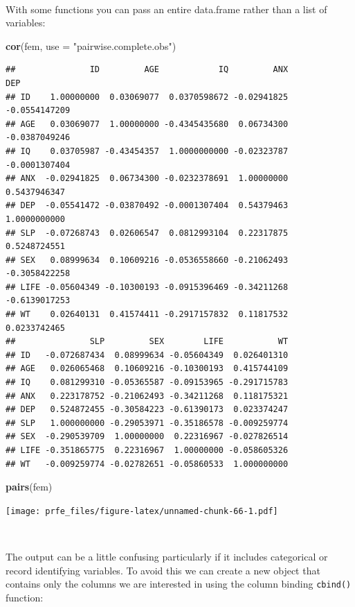 \documentclass[12pt,a4paper]{book}
\newenvironment{Shaded}{\begin{snugshade}}{\end{snugshade}}
\newcommand{\KeywordTok}[1]{\textcolor[rgb]{0.13,0.29,0.53}{\textbf{#1}}}
\newcommand{\DataTypeTok}[1]{\textcolor[rgb]{0.13,0.29,0.53}{#1}}
\newcommand{\StringTok}[1]{\textcolor[rgb]{0.31,0.60,0.02}{#1}}
\newcommand{\NormalTok}[1]{#1}
\theoremstyle{definition}
\theoremstyle{definition}
\theoremstyle{definition}
\theoremstyle{remark}
\begin{document}
~

With some functions you can pass an entire data.frame rather than a list
of variables:

\begin{Shaded}
\begin{Highlighting}[]
\KeywordTok{cor}\NormalTok{(fem, }\DataTypeTok{use =} \StringTok{"pairwise.complete.obs"}\NormalTok{)}
\end{Highlighting}
\end{Shaded}

\begin{verbatim}
##               ID         AGE            IQ         ANX           DEP
## ID    1.00000000  0.03069077  0.0370598672 -0.02941825 -0.0554147209
## AGE   0.03069077  1.00000000 -0.4345435680  0.06734300 -0.0387049246
## IQ    0.03705987 -0.43454357  1.0000000000 -0.02323787 -0.0001307404
## ANX  -0.02941825  0.06734300 -0.0232378691  1.00000000  0.5437946347
## DEP  -0.05541472 -0.03870492 -0.0001307404  0.54379463  1.0000000000
## SLP  -0.07268743  0.02606547  0.0812993104  0.22317875  0.5248724551
## SEX   0.08999634  0.10609216 -0.0536558660 -0.21062493 -0.3058422258
## LIFE -0.05604349 -0.10300193 -0.0915396469 -0.34211268 -0.6139017253
## WT    0.02640131  0.41574411 -0.2917157832  0.11817532  0.0233742465
##               SLP         SEX        LIFE           WT
## ID   -0.072687434  0.08999634 -0.05604349  0.026401310
## AGE   0.026065468  0.10609216 -0.10300193  0.415744109
## IQ    0.081299310 -0.05365587 -0.09153965 -0.291715783
## ANX   0.223178752 -0.21062493 -0.34211268  0.118175321
## DEP   0.524872455 -0.30584223 -0.61390173  0.023374247
## SLP   1.000000000 -0.29053971 -0.35186578 -0.009259774
## SEX  -0.290539709  1.00000000  0.22316967 -0.027826514
## LIFE -0.351865775  0.22316967  1.00000000 -0.058605326
## WT   -0.009259774 -0.02782651 -0.05860533  1.000000000
\end{verbatim}

\begin{Shaded}
\begin{Highlighting}[]
\KeywordTok{pairs}\NormalTok{(fem)}
\end{Highlighting}
\end{Shaded}

\texttt{[image: prfe\_files/figure-latex/unnamed-chunk-66-1.pdf]}

~

The output can be a little confusing particularly if it includes
categorical or record identifying variables. To avoid this we can create
a new object that contains only the columns we are interested in using
the column binding \texttt{cbind()} function:
\end{document}
